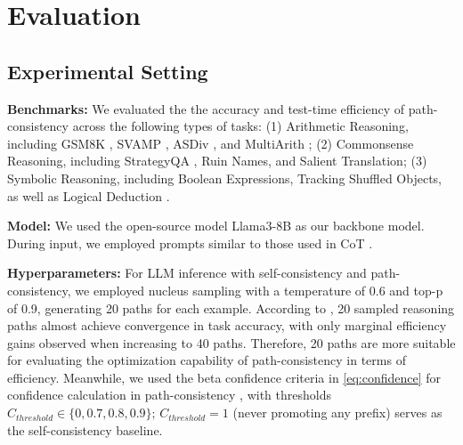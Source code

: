
\section{Evaluation} \label{sec:evaluation}

\subsection{Experimental Setting} \label{sec:setting}

\textbf{Benchmarks:}
We evaluated the the accuracy and test-time efficiency of path-consistency across the following types of tasks: (1) Arithmetic Reasoning, including GSM8K \cite{cobbe2021training}, SVAMP \cite{patel2021nlp}, ASDiv \cite{miao2020diverse}, and MultiArith \cite{roy2015solving}; (2) Commonsense Reasoning, including StrategyQA \cite{geva2021did}, Ruin Names, and Salient Translation; (3) Symbolic Reasoning, including Boolean Expressions, Tracking Shuffled Objects, as well as Logical Deduction \cite{suzgun-etal-2023-challenging}.

\textbf{Model:} We used the open-source model Llama3-8B \cite{grattafiori2024llama3herdmodels} as our backbone model. During input, we employed prompts similar to those used in CoT \cite{wei2022chain}.

\textbf{Hyperparameters:} For LLM inference with self-consistency and path-consistency, we employed nucleus sampling with a temperature of 0.6 and top-p of 0.9, generating 20 paths for each example. According to \citet{wang2022self}, 20 sampled reasoning paths almost achieve convergence in task accuracy, with only marginal efficiency gains observed when increasing to 40 paths. Therefore, 20 paths are more suitable for evaluating the optimization capability of path-consistency in terms of efficiency. Meanwhile, we used the beta confidence criteria in \cref{eq:confidence} for confidence calculation in path-consistency \cite{aggarwal2023let}, with thresholds $C_{threshold}\in\{0, 0.7, 0.8, 0.9\}$; $C_{threshold}=1$ (never promoting any prefix) serves as the self-consistency baseline. 

